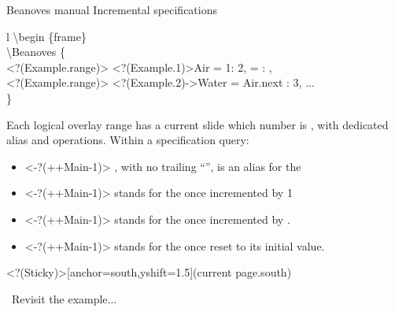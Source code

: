 \documentclass{beamer}
\begin{document}
\begin{frame}
{Beanoves manual}
{\large Incremental specifications}
\begin{myCodeBox}{l}%
\backslash begin \{frame\}\\
\backslash Beanoves \{\\
\phantom{xx}%
\alt<?(Example.range)>{%
  {\only<?(Example.1)>{\color{MyGreen}}Air \phantom{xx}= 1\phantom{xxxxxxxx}: 2,}
}{%
   =  : ,
}\\
\alt<?(Example.range)>{%
\phantom{xx}%
{\only<?(Example.2)->{\color{MyGreen}}Water = Air.next : 3,}
}{%
\phantom{xx}...
}\\
\}
\end{myCodeBox}
Each logical overlay range has a current slide which number is , with dedicated alias and operations.
Within a specification query:
\begin{itemize}
\item
\only<-?(++Main-1)>{}%
, with no trailing ``'', is an alias for the 
\item
\only<-?(++Main-1)>{}%
 stands for the  once incremented by 1
\item
\only<-?(++Main-1)>{}%
 stands for the  once incremented by .
\item
\only<-?(++Main-1)>{}%
 stands for the  once reset to its initial value.
\end{itemize}
%
\Sticky<?(Sticky)>[anchor=south,yshift=1.5\baselineskip](current page.south){\bfseries%
\begin{minipage}{0.5\textwidth}
\myWatch\ Revisit the example...
\end{minipage}
}%
\vspace{2\baselineskip}
%
\end{frame}


\end{document}
